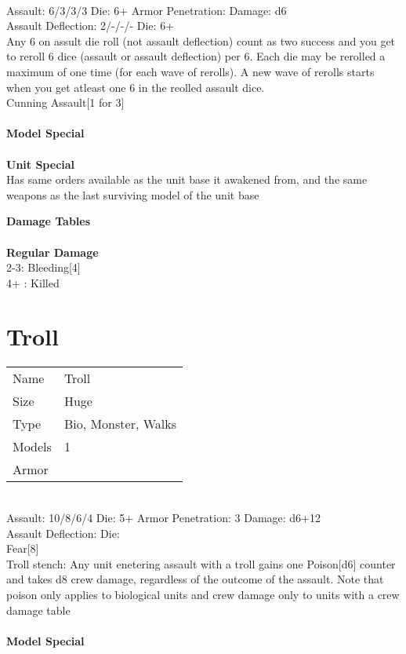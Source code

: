 \ \\
Assault: 6/3/3/3 Die: 6+ Armor Penetration:  Damage: d6 \\
Assault Deflection: 2/-/-/- Die: 6+\\
\indent Any 6 on assult die roll (not assault deflection) count as two success and you get to reroll 6 dice (assault or assault deflection) per 6. Each die may be rerolled a maximum of one time (for each wave of rerolls). A new wave of rerolls starts when you get atleast one 6 in the reolled assault dice.\\ Cunning Assault[1 for 3] \\
\ \\
{\bf Model Special} \\

\ \\



{\bf Unit Special} \\
Has same orders available as the unit base it awakened from, and the same weapons as the last surviving model of the unit base

{\bf Damage Tables} \\
\ \\ {\bf Regular Damage } \\
2-3: Bleeding[4] \\
4+ : Killed \\










\pagebreak

\section{ Troll }

\begin{tabular}{ll}
  Name & Troll \\
  Size & Huge\\
  Type & Bio, Monster, Walks\\
  Models & 1\\
  Armor & \\
\end{tabular}



\ \\
Assault: 10/8/6/4 Die: 5+ Armor Penetration: 3 Damage: d6+12 \\
Assault Deflection:  Die: \\
\indent Fear[8]\\ Troll stench: Any unit enetering assault with a troll gains one Poison[d6] counter and takes d8 crew damage, regardless of the outcome of the assault. Note that poison only applies to biological units and crew damage only to units with a crew damage table \\
\ \\
{\bf Model Special} \\

